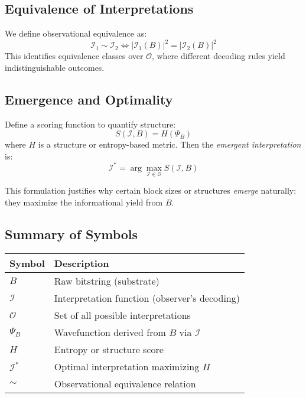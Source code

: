 \subsection{Equivalence of Interpretations}

We define observational equivalence as:
\[
\mathcal{I}_1 \sim \mathcal{I}_2 \iff \left| \mathcal{I}_1(B) \right|^2 = \left| \mathcal{I}_2(B) \right|^2
\]
This identifies equivalence classes over \( \mathcal{O} \), where different decoding rules yield indistinguishable outcomes.

\subsection{Emergence and Optimality}

Define a scoring function to quantify structure:
\[
S(\mathcal{I}, B) = H(\Psi_B)
\]
where \( H \) is a structure or entropy-based metric. Then the \emph{emergent interpretation} is:
\[
\mathcal{I}^* = \arg\max_{\mathcal{I} \in \mathcal{O}} S(\mathcal{I}, B)
\]

This formulation justifies why certain block sizes or structures \emph{emerge} naturally: they maximize the informational yield from \( B \).

\subsection{Summary of Symbols}

\begin{center}
\begin{tabular}{ll}
Symbol & Description \\
\hline
\( B \) & Raw bitstring (substrate) \\
\( \mathcal{I} \) & Interpretation function (observer's decoding) \\
\( \mathcal{O} \) & Set of all possible interpretations \\
\( \Psi_B \) & Wavefunction derived from \( B \) via \( \mathcal{I} \) \\
\( H \) & Entropy or structure score \\
\( \mathcal{I}^* \) & Optimal interpretation maximizing \( H \) \\
\( \sim \) & Observational equivalence relation \\
\end{tabular}
\end{center}

